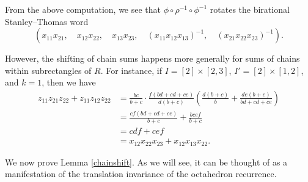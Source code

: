 \documentclass[ALCO,Unicode,published]{cedram}
\numberwithin{equation}{section}
\begin{document}
\begin{Ex}

From the above computation, we see that $\phi \circ \rho^{-1} \circ \phi^{-1}$ rotates the birational Stanley--Thomas word
\[(x_{11}x_{21}, \quad x_{12}x_{22}, \quad x_{13}x_{23},\quad  (x_{11}x_{12}x_{13})^{-1},\quad (x_{21}x_{22}x_{23})^{-1} ).\]

However, the shifting of chain sums happens more generally for sums of chains within subrectangles of $R$. For instance, if $I = [2] \times [2,3]$, $I' = [2] \times [1,2]$, and $k=1$, then we have
\begin{align*}
    z_{11}z_{21}z_{22}+z_{11}z_{12}z_{22} &= \frac{bc}{b+c}\cdot \frac{f(bd+cd+ce)}{d(b+c)} \left( \frac{d(b+c)}{b} + \frac{de(b+c)}{bd+cd+ce} \right) \\
    &= \frac{cf(bd+cd+ce)}{b+c} + \frac{bcef}{b+c}\\
    &= cdf+cef \\
    &= x_{12}x_{22}x_{23}+x_{12}x_{13}x_{22}.
\end{align*}
\end{Ex}

We now prove Lemma \ref{chainshift}. As we will see, it can be thought of as a manifestation of the translation invariance of the octahedron recurrence.
\end{document}
